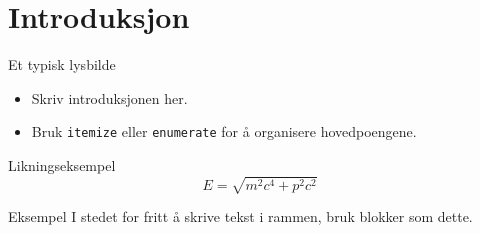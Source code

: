 \documentclass[aspectratio=169, mathserif]{beamer}
\begin{document}
	\section{Introduksjon}
	
	\begin{frame}{Et typisk lysbilde}
		
		
		\begin{itemize}
			\item Skriv introduksjonen her.
			\item Bruk \texttt{itemize} eller \texttt{enumerate} for å organisere hovedpoengene.
		\end{itemize}
		
		\begin{block}{Likningseksempel}
			\begin{equation}
				E = \sqrt{m^2c^4 + p^2c^2}
			\end{equation}
		\end{block}
		
		\begin{block}{Eksempel}
			I stedet for fritt å skrive tekst i rammen, bruk blokker som dette. 
		\end{block}
		
	\end{frame}
	
	
\end{document}
